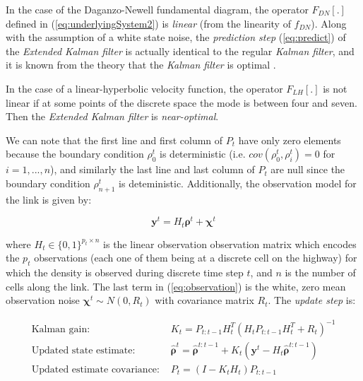 In the case of the Daganzo-Newell fundamental diagram, the operator $F_{DN}[.]$ defined in (\ref{eq:underlyingSystem2}) is \textit{linear} (from the linearity of $f_{DN}$). Along with the assumption of a white state noise, the \textit{prediction step} (\ref{eq:predict}) of the \textit{Extended Kalman filter} is actually identical to the regular \textit{Kalman filter}, and it is known from the theory that the \textit{Kalman filter} is optimal \cite{Anderson2005}.

In the case of a linear-hyperbolic velocity function, the operator $F_{LH}[.]$ is not linear if at some points of the discrete space the mode is between four and seven. Then the \textit{Extended Kalman filter} is \textit{near-optimal}.

We can note that the first line and first column of $P_{t}$ have only zero elements because the boundary condition $\rho^{t}_{0}$ is deterministic (i.e. $cov(\rho^{t}_{0},\rho^{t}_{i})=0$ for $i=1,...,n$), and similarly the last line and last column of $P_{t}$ are null since the boundary condition $\rho^{t}_{n+1}$ is deteministic. Additionally, the observation model for the link is given by:

\begin{equation}
\boldsymbol y^{t} = H_{t}\boldsymbol\rho^{t} + \boldsymbol\chi^{t}
\end{equation}

\noindent where $H_{t}\in \{ 0,1 \}^{p_{t}\times n}$ is the linear observation observation matrix which encodes the $p_{t}$ observations (each one of them being at a discrete cell on the highway) for which the density is observed during discrete time step $t$, and $n$ is the number of cells along the link. The last term in (\ref{eq:observation}) is the white, zero mean observation noise $\boldsymbol\chi^{t} \sim N(0,R_{t})$ with covariance matrix $R_{t}$. The \textit{update step} is:

\begin{equation}
\begin{array}{ll}
\text{Kalman gain: } & K_{t} = P_{t:t-1}H_{t}^{T}\left(H_{t}P_{t:t-1}H_{t}^{T}+R_{t}\right)^{-1}\\
\text{Updated state estimate: } & \hat{\boldsymbol\rho}^{t} = \hat{\boldsymbol\rho}^{t:t-1} + K_{t}(\boldsymbol y^{t} - H_{t}\hat{\boldsymbol\rho}^{t:t-1})\\
\text{Updated estimate covariance: } & P_{t} = (I - K_{t}H_{t})P_{t:t-1}
\end{array}
\end{equation}


